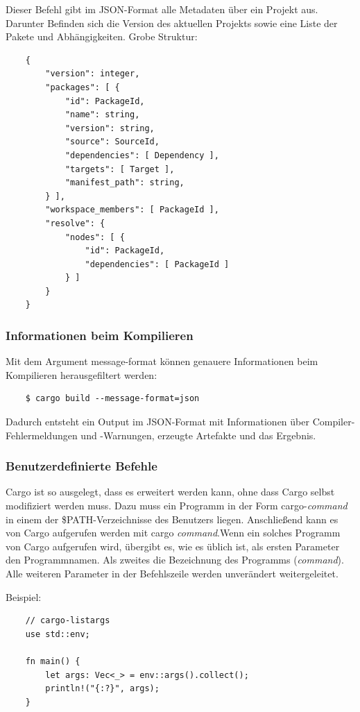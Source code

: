 Dieser Befehl gibt im JSON-Format alle Metadaten über ein Projekt aus. Darunter Befinden sich die Version des aktuellen Projekts sowie eine Liste der Pakete und Abhängigkeiten. Grobe Struktur:

\begin{lstlisting}
    {
        "version": integer,
        "packages": [ {
            "id": PackageId,
            "name": string,
            "version": string,
            "source": SourceId,
            "dependencies": [ Dependency ],
            "targets": [ Target ],
            "manifest_path": string,
        } ],
        "workspace_members": [ PackageId ],
        "resolve": {
            "nodes": [ {
                "id": PackageId,
                "dependencies": [ PackageId ]
            } ]
        }
    }
\end{lstlisting}

\subsubsection{Informationen beim Kompilieren}

Mit dem Argument \glqq message-format\grqq{} können genauere Informationen beim Kompilieren herausgefiltert werden:

\begin{lstlisting}
    $ cargo build --message-format=json
\end{lstlisting}

Dadurch entsteht ein Output im JSON-Format mit Informationen über Compiler-Fehlermeldungen und -Warnungen, erzeugte Artefakte und das Ergebnis.

\subsubsection{Benutzerdefinierte Befehle}

Cargo ist so ausgelegt, dass es erweitert werden kann, ohne dass Cargo selbst modifiziert werden muss. Dazu muss ein Programm in der Form cargo-\textit{command} in einem der \$PATH-Verzeichnisse des Benutzers liegen. Anschließend kann es von Cargo aufgerufen werden mit \glqq cargo \textit{command}\grqq{}.Wenn ein solches Programm von Cargo aufgerufen wird, übergibt es, wie es üblich ist, als ersten Parameter den Programmnamen. Als zweites die Bezeichnung des Programms (\textit{command}). Alle weiteren Parameter in der Befehlszeile werden unverändert weitergeleitet.

Beispiel:

\begin{lstlisting}
    // cargo-listargs
    use std::env;

    fn main() {
        let args: Vec<_> = env::args().collect();
        println!("{:?}", args);
    }
\end{lstlisting}

